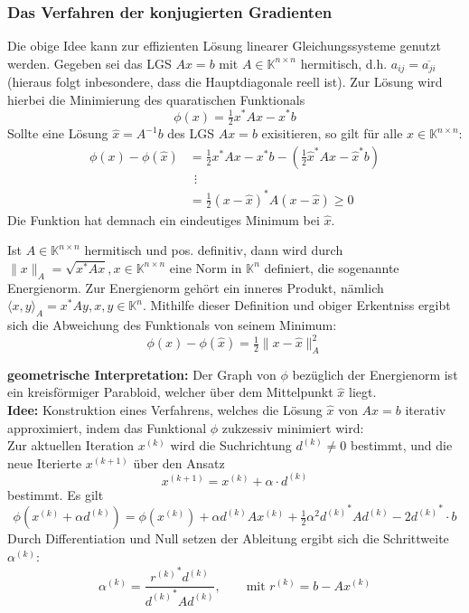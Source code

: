 \subsubsection{Das Verfahren der konjugierten Gradienten}
Die obige Idee kann zur effizienten Lösung linearer Gleichungssysteme genutzt werden.
Gegeben sei das LGS $Ax=b$ mit $A\in\mathbb{K}^{n\times n}$ hermitisch, 
d.h. $a_{ij}=\overline{a_{ji}}$ (hieraus folgt inbesondere, dass die Hauptdiagonale reell ist). 
Zur Lösung wird hierbei die Minimierung des quaratischen Funktionals 
\[\phi(x)=\tfrac{1}{2}x^* Ax - x^*b\]
Sollte eine Lösung $\hat{x}=A^{-1}b$ des LGS $Ax=b$ exisitieren, so gilt für alle $x\in\mathbb{K}^{n\times n}$:
\begin{align*}
    \phi(x)-\phi(\hat{x}) &= \tfrac{1}{2}x^* Ax - x^*b - (\tfrac{1}{2}\hat{x}^* A\hat{x} - \hat{x}^*b) \\
    &\ \ \vdots \\
    &= \tfrac{1}{2} (x-\hat{x})^*A(x-\hat{x}) \geq 0
\end{align*}
Die Funktion hat demnach ein eindeutiges Minimum bei $\hat{x}$.
\begin{defbox}
    Ist $A\in\mathbb{K}^{n\times n}$ hermitisch und pos. definitiv, dann wird durch $\|x\|_A=\sqrt{x^*Ax}, 
    x\in\mathbb{K}^{n\times n}$ eine Norm in $\mathbb{K}^n$ definiert, die sogenannte Energienorm. 
    Zur Energienorm gehört ein inneres Produkt, nämlich $\langle x,y\rangle_A=x^*Ay, x,y\in\mathbb{K}^n$.
    Mithilfe dieser Definition und obiger Erkentniss ergibt sich die Abweichung des Funktionals von seinem Minimum:
    \[\phi(x)-\phi(\hat{x}) = \tfrac{1}{2}\|x-\hat{x}\|^2_A\]
\end{defbox}
\textbf{geometrische Interpretation:} Der Graph von $\phi$ bezüglich der Energienorm ist ein kreisförmiger Parabloid, 
welcher über dem Mittelpunkt $\hat{x}$ liegt. \\
\textbf{Idee:} Konstruktion eines Verfahrens, welches die Lösung $\hat{x}$ von $Ax=b$ iterativ approximiert, 
indem das Funktional $\phi$ zukzessiv minimiert wird: \\
Zur aktuellen Iteration $x^{(k)}$ wird die Suchrichtung $d^{(k)}\neq 0$ bestimmt, und die neue Iterierte 
$x^{(k+1)}$ über den Ansatz 
\[x^{(k+1)} = x^{(k)} + \alpha\cdot d^{(k)} \tag{3}\]
bestimmt. Es gilt
\[\phi(x^{(k)}+\alpha d^{(k)}) = \phi(x^{(k)}) + \alpha d^{(k)}A x^{(k)} + 
\tfrac{1}{2}\alpha^2 {d^{(k)}}^*Ad^{(k)}-2{d^{(k)}}^*\cdot b \tag{4}\]
Durch Differentiation und Null setzen der Ableitung ergibt sich die Schrittweite $\alpha^{(k)}$:
\[\alpha^{(k)}=\dfrac{{r^{(k)}}^* d^{(k)}}{{d^{(k)}}^* A d^{(k)}},\qquad \text{mit } r^{(k)}=b-Ax^{(k)} \tag{5}\]
